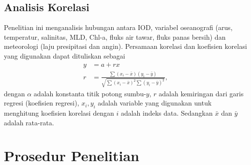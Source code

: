 \begin{spacing}{1.5}

	\subsection[Analisis Korelasi]{Analisis Korelasi}
		Penelitian ini menganalisis hubungan antara IOD, variabel oseanografi (arus, temperatur, salinitas, MLD, Chl-a, fluks air tawar, fluks panas bersih) dan meteorologi (laju presipitasi dan angin). Persamaan korelasi dan koefisien korelasi yang digunakan dapat dituliskan sebagai \cite{hidayat2023relationship,Haditiar2020}
		\begin{equation}
			\begin{aligned}
				y &= a+rx\\
				r &= \frac{\sum (x_i - \bar{x})(y_i - \bar{y})}{\sqrt{\sum (x_i-\bar{x})^2\sum (y_i-\bar{y})^2}},
			\end{aligned}
		\end{equation}
		dengan $\alpha$ adalah konstanta titik potong sumbu-$y$, $r$ adalah kemiringan dari garis regresi (koefisien regresi), $x_i, y_i$ adalah variable yang digunakan untuk menghitung koefisien korelasi dengan $i$ adalah indeks data. Sedangkan $\bar{x}$ dan $\bar{y}$ adalah rata-rata. 
		
\end{spacing}
\vspace{-0.5pc}
\section[Prosedur Penelitian]{Prosedur Penelitian}
